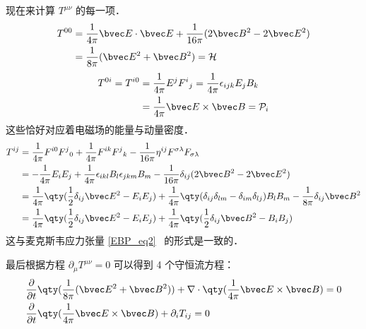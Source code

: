 现在来计算 $T^{\mu\nu}$ 的每一项．
\begin{equation}\label{EMtens_eq2}
\begin{aligned}
T^{00}&=\frac{1}{4\pi}\bvec E \cdot \bvec E+\frac{1}{16\pi}(2\bvec B^2-2\bvec E^2)\\
&=\frac{1}{8\pi}(\bvec E^2+\bvec B^2)=\mathcal{H}
\end{aligned}
\end{equation}
\begin{equation}\label{EMtens_eq3}
\begin{aligned}
T^{0i}=T^{i0}&=\frac{1}{4\pi}E^j F^i{}_j=\frac{1}{4\pi}\epsilon_{ijk}E_jB_k\\
&=\frac{1}{4\pi}\bvec E\times \bvec B=\mathcal{P}_i
\end{aligned}
\end{equation}
这些恰好对应着电磁场的能量与动量密度．
\begin{equation}\label{EMtens_eq4}
\begin{aligned}
T^{ij}&=\frac{1}{4\pi}F^{i0}F^j{}_0+\frac{1}{4\pi}F^{ik}F^j{}_k-\frac{1}{16\pi}\eta^{ij}F^{\sigma\lambda}F_{\sigma\lambda}\\
&=-\frac{1}{4\pi}E_iE_j+\frac{1}{4\pi}\epsilon_{ikl}B_l \epsilon_{jkm}B_m-\frac{1}{16\pi}\delta_{ij}(2\bvec B^2-2\bvec E^2)\\
&=\frac{1}{4\pi}\qty(\frac{1}{2}\delta_{ij}\bvec E^2-E_iE_j)+\frac{1}{4\pi}\qty(\delta_{ij}\delta_{lm}-\delta_{im}\delta_{lj})B_lB_m-\frac{1}{8\pi}\delta_{ij}\bvec B^2\\
&=\frac{1}{4\pi}\qty(\frac{1}{2}\delta_{ij}\bvec E^2-E_iE_j)+\frac{1}{4\pi}\qty(\frac{1}{2}\delta_{ij}\bvec B^2 - B_iB_j)
\end{aligned}
\end{equation}
这与麦克斯韦应力张量 \autoref{EBP_eq2}~ 的形式是一致的．

最后根据方程 $\partial_\mu T^{\mu\nu}=0$ 可以得到 4 个守恒流方程：
\begin{equation}
\begin{aligned}
&\frac{\partial }{\partial t}\qty(\frac{1}{8\pi}(\bvec E^2+\bvec B^2))+\nabla \cdot \qty(\frac{1}{4\pi}\bvec E\times \bvec B)=0\\
&\frac{\partial}{\partial t}\qty(\frac{1}{4\pi}\bvec E\times \bvec B)+\partial_i T_{ij}=0
\end{aligned}
\end{equation}

